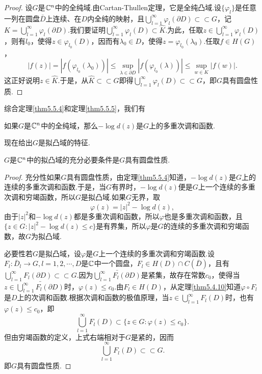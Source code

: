 \begin{proof}
	设$G$是$\mathbb C^n$中的全纯域.由Cartan-Thullen定理，它是全纯凸域.设$\{\varphi_l\}$是任意一列在圆盘$\bar{D}$上连续、在$D$内全纯的映射，且$\bigcup_{l=1}^\infty \varphi_l(\partial D)\subset\subset G$，记$K=\bigcup_{l=1}^\infty \varphi_l(\partial D)$.我们要证明$\bigcup_{l=1}^\infty \varphi_l(D)\subset\widehat{K}$.为此，任取$z\in\bigcup_{l=1}^\infty \varphi_l(D)$，则有$l_0$，使得$z\in\varphi_{l_0}(D)$，因而有$\lambda_0\in D$，使得$z=\varphi_{l_0}(\lambda_0)$.任取$f\in H(G)$，
	\[|f(z)|=|f(\varphi_{l_0}(\lambda_0))|\le\sup_{\lambda\in\partial D}|f(\varphi_{l_0}(\lambda))|\le\sup_{w\in K}|f(w)|.\]
	这正好说明$z\in\widehat{K}$.于是，从$\widehat{K}\subset\subset G$即得$\bigcup_{l=1}^\infty \varphi_l(D)\subset\subset G$，即$G$具有圆盘性质.
\end{proof}
综合定理\ref{thm5.5.4}和定理\ref{thm5.5.5}，我们有
\begin{theorem}\label{thm5.5.6}
	如果$G$是$\mathbb C^n$中的全纯域，那么$-\log d(z)$是$G$上的多重次调和函数.
\end{theorem}
现在给出$G$是拟凸域的特征.
\begin{theorem}\label{thm5.5.7}
	$G$是$\mathbb C^n$中的拟凸域的充分必要条件是$G$具有圆盘性质.
\end{theorem}
\begin{proof}
	充分性\quad 如果$G$具有圆盘性质，由定理\ref{thm5.5.4}知道，$-\log d(z)$是$G$上的连续的多重次调和函数.于是，当$G$有界时，$-\log d(z)$便是$G$上一个连续的多重次调和穷竭函数，所以$G$是拟凸域.如果$G$无界，取
	\[\varphi(z)=|z|^2-\log d(z),\]
	由于$|z|^2$和$-\log d(z)$都是多重次调和函数，所以$\varphi$也是多重次调和函数，且$\{z\in G\colon |z|^2-\log d(z)\le c\}$是有界集，所以$\varphi$是$G$的连续的多重次调和穷竭函数，故$G$为拟凸域.
	
	必要性\quad 若$G$是拟凸域，设$\varphi$是$G$上一个连续的多重次调和穷竭函数.设$F_l\colon\bar{D}_l\to G,l=1,2,\cdots,D$是$\mathbb C$中一个圆盘，$F_l\in H(D)\cap C(\bar{D})$，且有$\bigcup_{l=1}^\infty F_l(\partial D)\subset\subset G$.因为$\bar{\bigcup_{l=1}^\infty F_l(\partial D)}$是紧集，故存在常数$c_0$，使得当$z\in\bar{\bigcup_{l=1}^\infty F_l(\partial D)}$时，$\varphi(z)\le c_0$.由$F_l\in H(D)$，从定理\ref{thm5.4.10}知道$\varphi\circ F_l$是$D$上的次调和函数.根据次调和函数的极值原理，当$z\in\bigcup_{l=1}^\infty F_l(D)$时，也有$\varphi(z)\le c_0$，即
	\[\bigcup_{l=1}^\infty F_l(D)\subset\{z\in G\colon\varphi(z)\le c_0\}.\]
	但由穷竭函数的定义，上式右端相对于$G$是紧的，因而
	\[\bigcup_{l=1}^\infty F_l(D)\subset\subset G.\]
	即$G$具有圆盘性质.
\end{proof}
